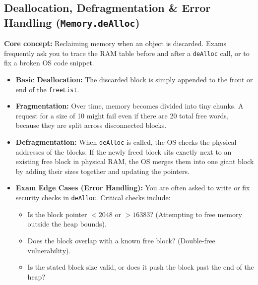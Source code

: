\documentclass[12pt,a4paper]{article}
\begin{document}
\subsection{Deallocation, Defragmentation \& Error Handling (\texttt{Memory.deAlloc})}
\textbf{Core concept:} Reclaiming memory when an object is discarded. Exams frequently ask you to trace the RAM table before and after a \texttt{deAlloc} call, or to fix a broken OS code snippet.
\begin{itemize}
    \item \textbf{Basic Deallocation:} The discarded block is simply appended to the front or end of the \texttt{freeList}.
    \item \textbf{Fragmentation:} Over time, memory becomes divided into tiny chunks. A request for a size of 10 might fail even if there are 20 total free words, because they are split across disconnected blocks.
    \item \textbf{Defragmentation:} When \texttt{deAlloc} is called, the OS checks the physical addresses of the blocks. If the newly freed block sits exactly next to an existing free block in physical RAM, the OS merges them into one giant block by adding their sizes together and updating the pointers.
    \item \textbf{Exam Edge Cases (Error Handling):} You are often asked to write or fix security checks in \texttt{deAlloc}. Critical checks include:
    \begin{itemize}
        \item Is the block pointer $< 2048$ or $> 16383$? (Attempting to free memory outside the heap bounds).
        \item Does the block overlap with a known free block? (Double-free vulnerability).
        \item Is the stated block size valid, or does it push the block past the end of the heap?
    \end{itemize}
\end{itemize}
\end{document}
